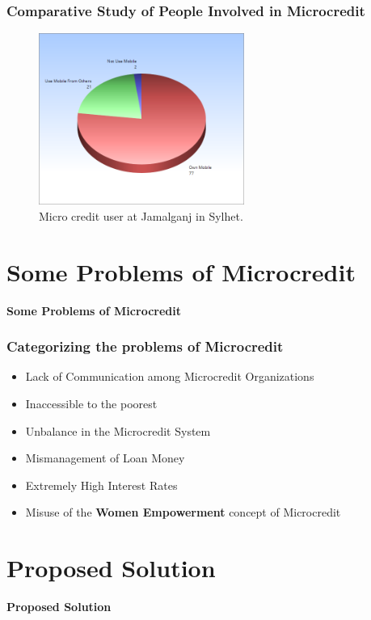 \documentclass{beamer}
\begin{document}
\begin{frame}
\frametitle{Comparative Study of People Involved in Microcredit}
\begin{figure}
\includegraphics[width=0.6\textwidth]{g4.png}
\caption{Micro credit user at Jamalganj in Sylhet.}
\end{figure}
\end{frame}

\section{Some Problems of Microcredit}
\begin{frame}
\begin{center}
{\LARGE \textbf{Some Problems of Microcredit}}
\end{center}
\end{frame}

\begin{frame}
\frametitle{Categorizing the problems of Microcredit}
\begin{itemize}
\item Lack of Communication among Microcredit Organizations \pause
\item Inaccessible to the poorest \pause
\item Unbalance in the Microcredit System \pause
\item Mismanagement of Loan Money \pause
\item Extremely High Interest Rates \pause
\item Misuse of the \textbf{Women Empowerment} concept of Microcredit \pause
\end{itemize}
\end{frame}

\section{Proposed Solution}
\begin{frame}
\begin{center}
{\LARGE \textbf{Proposed Solution}}
\end{center}
\end{frame}
\end{document}
